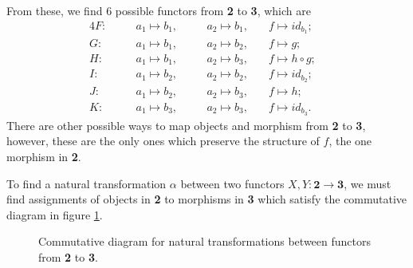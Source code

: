 \documentclass[12pt]{article}
\begin{document}
From these, we find 6 possible functors from \textbf{2} to \textbf{3}, which are
\begin{alignat*}{4}
    F: &\quad& a_1 \mapsto b_1,  &\quad& a_2 \mapsto b_1, &\quad f\mapsto id_{b_1};& \\
    G: &\quad& a_1 \mapsto b_1,  &\quad& a_2 \mapsto b_2, &\quad f\mapsto g;& \\
    H: &\quad& a_1 \mapsto b_1,  &\quad& a_2 \mapsto b_3, &\quad f\mapsto h\circ g;& \\
    I: &\quad& a_1 \mapsto b_2,  &\quad& a_2 \mapsto b_2, &\quad f\mapsto id_{b_2};& \\
    J: &\quad& a_1 \mapsto b_2,  &\quad& a_2 \mapsto b_3, &\quad f\mapsto h;& \\
    K: &\quad& a_1 \mapsto b_3,  &\quad& a_2 \mapsto b_3, &\quad f\mapsto id_{b_3}.&
\end{alignat*}
There are other possible ways to map objects and morphism from \textbf{2} to \textbf{3}, however, these are the only ones which preserve the structure of $f$, the one morphism in \textbf{2}.

To find a natural transformation $\alpha$ between two functors $X,Y:\textbf{2}\rightarrow\textbf{3}$, we must find assignments of objects in \textbf{2} to morphisms in \textbf{3} which satisfy the commutative diagram in figure \ref{fig:square}.

\begin{figure}[ht]
    \centering
    \caption{Commutative diagram for natural transformations between functors from \textbf{2} to \textbf{3}.}
    \label{fig:square}
\end{figure}
\end{document}
